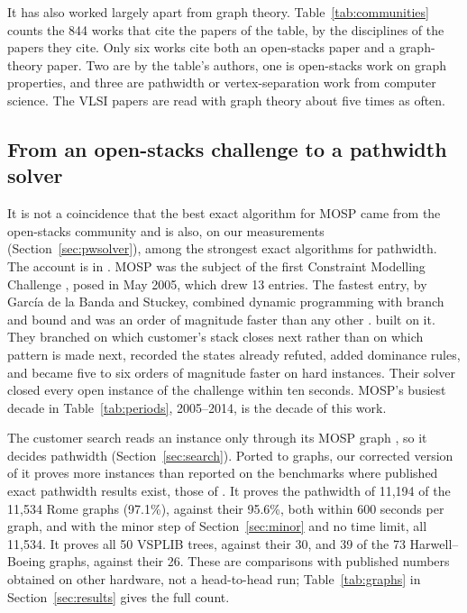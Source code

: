 \begin{table}[t]
\centering\small
\caption{The open-stacks papers are read apart from graph theory. Works citing
the papers that the Linhares--Yanasse table cites, by the discipline of the
papers they cite. Of 135 works citing an operations-research paper, 6 also cite
a graph-theory paper (4\%); of 285 citing a VLSI paper, 65 do (23\%). The 2002
paper itself counts as operations research. OpenAlex, 29 September 2026; 844
citing works in all.}
\label{tab:communities}

\end{table}

It has also worked largely apart from graph theory. Table~\ref{tab:communities}
counts the 844 works that cite the papers of the table, by the disciplines of
the papers they cite. Only six works cite both an open-stacks paper and a
graph-theory paper. Two are by the table's authors, one is open-stacks work on
graph properties, and three are pathwidth or vertex-separation work from
computer science. The VLSI papers are read with graph theory about five times as
often.

\subsection{From an open-stacks challenge to a pathwidth solver}

It is not a coincidence that the best exact algorithm for MOSP came from the
open-stacks community and is also, on our measurements (Section~\ref{sec:pwsolver}), among the strongest exact algorithms for pathwidth. The account is
in \citet[\S1]{ChuStuckey2009}. MOSP was the subject of the first Constraint
Modelling Challenge \citep{SmithGent2005}, posed in May 2005, which drew 13
entries. The fastest entry, by García de la Banda and Stuckey, combined dynamic
programming with branch and bound and was an order of magnitude faster than
any other \citep{GarciaDeLaBandaStuckey2007}. \citet{ChuStuckey2009} built on
it. They branched on which customer's stack closes next rather than on which
pattern is made next, recorded the states already refuted, added dominance
rules, and became
five to six orders of magnitude faster on hard instances. Their solver closed
every open instance of the challenge within ten seconds. MOSP's busiest decade
in Table~\ref{tab:periods}, 2005--2014, is the decade of this work.

The customer search reads an instance only through its MOSP graph
\citep[p.~4]{ChuStuckey2009}, so it decides pathwidth
(Section~\ref{sec:search}). Ported to graphs, our corrected version of it proves more instances than reported on the benchmarks where published exact pathwidth results exist, those
of \citet{CoudertMazauricNisse2016}. It proves the pathwidth of 11,194 of the
11,534 Rome graphs (97.1\%), against their 95.6\%, both within 600 seconds per
graph, and with the minor step of Section~\ref{sec:minor} and no time limit,
all 11,534. It proves all 50 VSPLIB trees, against their 30, and 39 of the 73
Harwell--Boeing graphs, against their 26. These are comparisons with published
numbers obtained on other hardware, not a head-to-head run;
Table~\ref{tab:graphs} in Section~\ref{sec:results} gives the full count.

